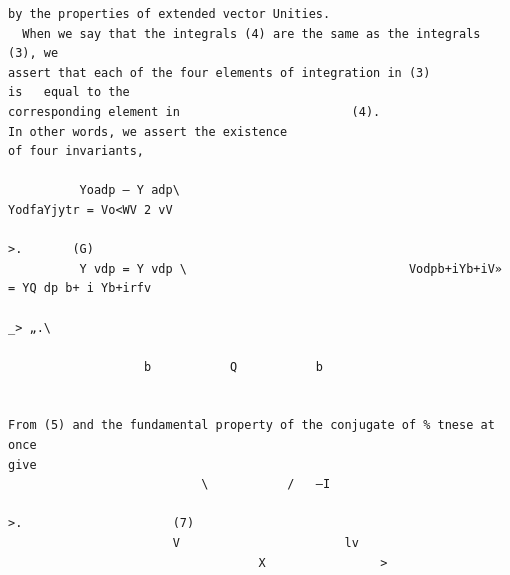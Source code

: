\documentclass[10pt]{article}
\begin{document}
\begin{verbatim}
by the properties of extended vector Unities.
  When we say that the integrals (4) are the same as the integrals (3), we
assert that each of the four elements of integration in (3)                                                is   equal to the
corresponding element in                        (4).                  In other words, we assert the existence
of four invariants,

          Yoadp — Y adp\                                          YodfaYjytr = Vo<WV 2 vV
                                                                                                                    >.       (G)
          Y vdp = Y vdp \                               Vodpb+iYb+iV» = YQ dp b+ i Yb+irfv
                                                                                                           _> „.\

                   b           Q           b


From (5) and the fundamental property of the conjugate of % tnese at once
give
                           \           /   —I
                                                                                                      >.                     (7)
                       V                       lv
                                   X                >


\end{verbatim}
\clearpage
\end{document}
